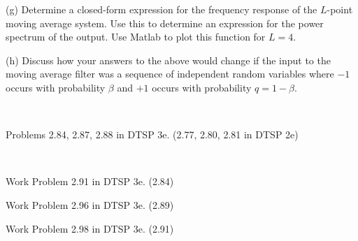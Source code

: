 \documentclass[12pt]{report}
\begin{document}
\begin{description}
\item{(g)} Determine a closed-form expression for the frequency response of
    the $L$-point moving average system. Use this to determine an expression for the power spectrum of the output. Use Matlab to plot this function for $L=4$.
\item{(h)} Discuss how your answers to the above would change if the input
    to the moving average filter was a sequence of independent random
    variables where $-1$ occurs with probability $\beta$ and $+1$ occurs with
    probability $q=1-\beta$.
\end{description}
\newpage


\\


Problems  2.84, 2.87, 2.88 in DTSP 3e. (2.77, 2.80, 2.81 in DTSP 2e)

\mbox{}\\

Work Problem  2.91 in DTSP 3e. (2.84) \\


Work Problem 2.96 in DTSP 3e. (2.89) \\


Work Problem 2.98 in DTSP 3e. (2.91) \\
\newpage


\end{document}
